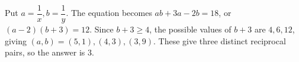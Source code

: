 Put $a=\dfrac{1}{x},b=\dfrac{1}{y}$. The equation becomes $ab+3a-2b=18$, or $(a-2)(b+3)=12$. Since $b+3\ge4$, the possible values of $b+3$ are $4,6,12$, giving $(a,b)=(5,1),(4,3),(3,9)$. These give three distinct reciprocal pairs, so the answer is $\boxed3$.
